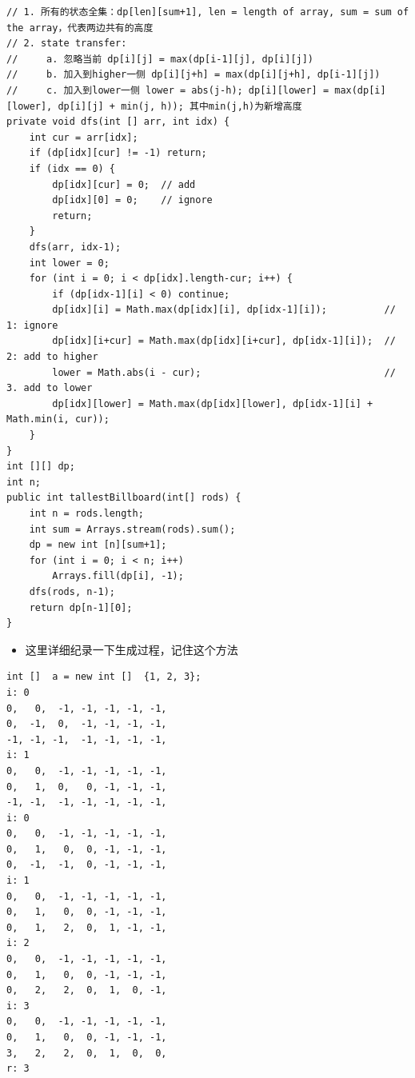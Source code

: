 \documentclass[9pt, b5paper]{article}
\begin{document}
\begin{verbatim}
// 1. 所有的状态全集：dp[len][sum+1], len = length of array, sum = sum of the array，代表两边共有的高度
// 2. state transfer:
//     a. 忽略当前 dp[i][j] = max(dp[i-1][j], dp[i][j])
//     b. 加入到higher一侧 dp[i][j+h] = max(dp[i][j+h], dp[i-1][j])
//     c. 加入到lower一侧 lower = abs(j-h); dp[i][lower] = max(dp[i][lower], dp[i][j] + min(j, h)); 其中min(j,h)为新增高度
private void dfs(int [] arr, int idx) {
    int cur = arr[idx];
    if (dp[idx][cur] != -1) return;
    if (idx == 0) {
        dp[idx][cur] = 0;  // add
        dp[idx][0] = 0;    // ignore
        return;
    }
    dfs(arr, idx-1);
    int lower = 0;
    for (int i = 0; i < dp[idx].length-cur; i++) {
        if (dp[idx-1][i] < 0) continue;
        dp[idx][i] = Math.max(dp[idx][i], dp[idx-1][i]);          // 1: ignore
        dp[idx][i+cur] = Math.max(dp[idx][i+cur], dp[idx-1][i]);  // 2: add to higher
        lower = Math.abs(i - cur);                                // 3. add to lower
        dp[idx][lower] = Math.max(dp[idx][lower], dp[idx-1][i] + Math.min(i, cur)); 
    }
}
int [][] dp;
int n;
public int tallestBillboard(int[] rods) { 
    int n = rods.length;
    int sum = Arrays.stream(rods).sum();
    dp = new int [n][sum+1];
    for (int i = 0; i < n; i++) 
        Arrays.fill(dp[i], -1);
    dfs(rods, n-1);
    return dp[n-1][0];
}
\end{verbatim}
\begin{itemize}
\item 这里详细纪录一下生成过程，记住这个方法
\end{itemize}
\begin{verbatim}
int []  a = new int []  {1, 2, 3};
i: 0
0,   0,  -1, -1, -1, -1, -1,
0,  -1,  0,  -1, -1, -1, -1,
-1, -1, -1,  -1, -1, -1, -1,
i: 1
0,   0,  -1, -1, -1, -1, -1,
0,   1,  0,   0, -1, -1, -1,
-1, -1,  -1, -1, -1, -1, -1,
i: 0
0,   0,  -1, -1, -1, -1, -1,
0,   1,   0,  0, -1, -1, -1,
0,  -1,  -1,  0, -1, -1, -1,
i: 1
0,   0,  -1, -1, -1, -1, -1,
0,   1,   0,  0, -1, -1, -1,
0,   1,   2,  0,  1, -1, -1,
i: 2
0,   0,  -1, -1, -1, -1, -1,
0,   1,   0,  0, -1, -1, -1,
0,   2,   2,  0,  1,  0, -1,
i: 3
0,   0,  -1, -1, -1, -1, -1,
0,   1,   0,  0, -1, -1, -1,
3,   2,   2,  0,  1,  0,  0,
r: 3
\end{verbatim}
\end{document}
